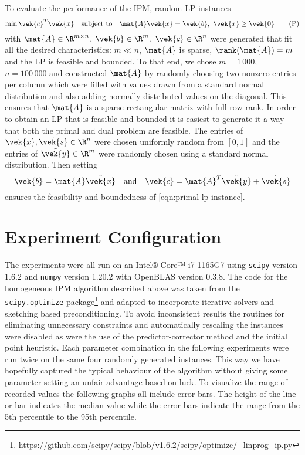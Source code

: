 To evaluate the performance of the IPM, random LP instances 
\begin{equation}\label{eqn:primal-lp-instance}
  \min \vek{c}^T \vek{x} \quad \text{subject to} \quad \mat{A}\vek{x} = \vek{b}, \ \vek{x} \geq \vek{0} \tag{P}
 \end{equation}
with \(\mat{A} \in \R^{m \times n}\), \(\vek{b} \in \R^m\), \(\vek{c} \in \R^n\) were generated that fit all the desired characteristics: \(m \ll n\), \(\mat{A}\) is sparse, \(\rank(\mat{A}) = m\) and the LP is feasible and bounded.
To that end, we chose \(m = 1\,000\), \(n = 100\,000\) and constructed \(\mat{A}\) by randomly choosing two nonzero entries per column which were filled with values drawn from a standard normal distribution and also adding normally distributed values on the diagonal.
This ensures that \(\mat{A}\) is a sparse rectangular matrix with full row rank.
In order to obtain an LP that is feasible and bounded it is easiest to generate it a way that both the primal and dual problem are feasible.
The entries of \(\tilde{\vek{x}}, \tilde{\vek{s}} \in \R^n\) were chosen uniformly random from \([0, 1]\) and the entries of \(\tilde{\vek{y}} \in \R^m\) were randomly chosen using a standard normal distribution.
Then setting
\begin{equation}
  \vek{b} = \mat{A} \tilde{\vek{x}} \quad \text{and} \quad \vek{c} = \mat{A}^T \tilde{\vek{y}} + \tilde{\vek{s}}
\end{equation}
ensures the feasibility and boundedness of \cref{eqn:primal-lp-instance}.

\section{Experiment Configuration}

The experiments were all run on an Intel® Core™ i7-1165G7 using \texttt{scipy} version 1.6.2 and \texttt{numpy} version 1.20.2 with OpenBLAS version 0.3.8.
The code for the homogeneous IPM algorithm described above was taken from the \texttt{scipy.optimize} package\footnote{\url{https://github.com/scipy/scipy/blob/v1.6.2/scipy/optimize/_linprog_ip.py}} and adapted to incorporate iterative solvers and sketching based preconditioning.
To avoid inconsistent results the routines for eliminating unnecessary constraints and automatically rescaling the instances were disabled as were the use of the predictor-corrector method and the initial point heuristic.
Each parameter combination in the following experiments were run twice on the same four randomly generated instances.
This way we have hopefully captured the typical behaviour of the algorithm without giving some parameter setting an unfair advantage based on luck.
To visualize the range of recorded values the following graphs all include error bars.
The height of the line or bar indicates the median value while the error bars indicate the range from the 5th percentile to the 95th percentile.

